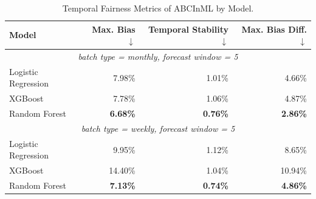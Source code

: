 \begin{table}
  \caption{Temporal Fairness Metrics of ABCInML by Model.}
  \label{tab:temporal-abcinml-models}
  \begin{tabular}{lrrr}
    \toprule
    Model & Max. Bias $\downarrow$ & Temporal Stability $\downarrow$ & Max. Bias Diff. $\downarrow$ \\
    \midrule
    \multicolumn{4}{c}{\textit{batch type = monthly, forecast window = 5}} \\
    \midrule
    Logistic Regression & 7.98\% & 1.01\% & 4.66\% \\
    XGBoost & 7.78\% & 1.06\% & 4.87\% \\
    Random Forest & \textbf{6.68\%} & \textbf{0.76\%} & \textbf{2.86\%} \\
    \midrule
    \multicolumn{4}{c}{\textit{batch type = weekly, forecast window = 5}} \\
    \midrule
    Logistic Regression & 9.95\% & 1.12\% & 8.65\% \\
    XGBoost & 14.40\% & 1.04\% & 10.94\% \\
    Random Forest & \textbf{7.13\%} & \textbf{0.74\%} & \textbf{4.86\%} \\
    \bottomrule
  \end{tabular}
\end{table}
